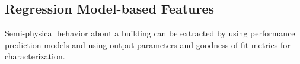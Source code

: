 \subsection{Regression Model-based Features}
\label{sec:regressionmodels}

Semi-physical behavior about a building can be extracted by using performance prediction models and using output parameters and goodness-of-fit metrics for characterization.